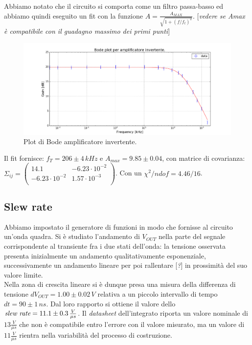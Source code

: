 \documentclass[10pt,a4paper]{article}
\newcommand{\rem}[1]{[\emph{#1}]}
\begin{document}
Abbiamo notato che il circuito si comporta come un filtro passa-basso ed abbiamo quindi  eseguito un fit con la funzione $ A=\frac{A_{MAX}}{\sqrt{1+(f/f_t)^2}}$.
\rem{vedere se Amax è compatibile con il guadagno massimo dei primi punti}

\begin{figure}[!htb]
  \centering
  \includegraphics[scale=0.5]{bodePlot.png}
\caption{Plot di Bode amplificatore invertente.}
\label{graficoBode}
\end{figure}

Il fit fornisce: $f_T = 206 \pm 4 \, kHz$ e $A_{max} = 9.85 \pm 0.04$, con matrice di covarianza:
$ \Sigma_{ij} = \left( \begin{array}{cc}
14.1 & -6.23 \cdot 10^{-2} \\ 
-6.23 \cdot 10^{-2} & 1.57 \cdot 10^{-3}\\
\end{array} \right)$. Con un $\chi^2/ndof = 4.46/16$.\\


\subsection{Slew rate}
Abbiamo impostato il generatore di funzioni in modo che fornisse al circuito un’onda quadra. Si è studiato l'andamento di $V_{OUT}$ nella parte del segnale corrispondente al transiente fra i due stati dell’onda: la tensione osservata presenta inizialmente un andamento qualitativamente esponenziale, successivamente un andamento lineare per poi rallentare \rem{?} in prossimità del suo valore limite.\\
Nella zona di crescita lineare si è dunque presa una misura della differenza di tensione $dV_{OUT} = 1.00 \pm 0.02 \, V$ relativa a un piccolo intervallo di tempo $dt=90 \pm 1 \, ns$. Dal loro rapporto si ottiene il valore dello $\emph{slew rate}= 11.1 \pm 0.3 \, \frac{V}{\mu s}$. Il \emph{datasheet} dell'integrato riporta un valore nominale di $13 \frac{V}{\mu s}$ che non è compatibile entro l'errore con il valore misurato, ma un valore di $11 \frac{V}{\mu s}$ rientra nella variabilità del processo di costruzione.
\end{document}
